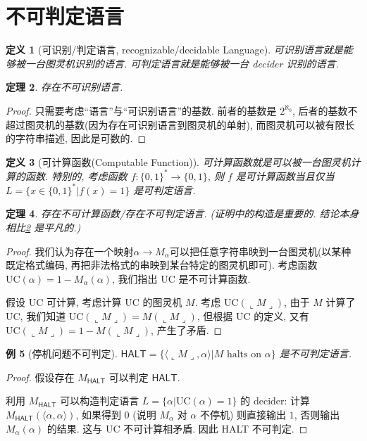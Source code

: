 \documentclass[8pt]{article}
\theoremstyle{compact}
\newtheorem{theorem}{定理}[section]
\newtheorem{definition}[theorem]{定义}
\newtheorem{example}[theorem]{例}
\def\rep#1{\llcorner{#1}\lrcorner}
\begin{document}
\section{不可判定语言}
\begin{definition}[可识别/判定语言, recognizable/decidable Language]
	可识别语言就是能够被一台图灵机识别的语言. 可判定语言就是能够被一台 decider 识别的语言.
\end{definition}
\begin{theorem}
	存在不可识别语言.
	\label{unrecognize_exists}
\end{theorem}
\begin{proof}
	只需要考虑“语言”与“可识别语言”的基数. 前者的基数是 $2^{\aleph_0}$, 后者的基数不超过图灵机的基数(因为存在可识别语言到图灵机的单射), 而图灵机可以被有限长的字符串描述, 因此是可数的.
\end{proof}
\begin{definition}[可计算函数(Computable Function)]
	可计算函数就是可以被一台图灵机计算的函数. 特别的, 考虑函数 $f: \{0, 1\}^* \to \{0, 1\}$, 则 $f$ 是可计算函数当且仅当 $L = \{x \in \{0, 1\}^*| f(x) = 1\}$ 是可判定语言.
\end{definition}
\begin{theorem}
	存在不可计算函数/存在不可判定语言. (证明中的构造是重要的. 结论本身相比\cref{unrecognize_exists} 是平凡的.)
\end{theorem}
\begin{proof}
	我们认为存在一个映射$\alpha \to M_{\alpha}$可以把任意字符串映到一台图灵机(以某种既定格式编码, 再把非法格式的串映到某台特定的图灵机即可). 考虑函数 $\text{UC}(\alpha) = 1 - M_{\alpha}(\alpha)$, 我们指出 $\text{UC}$ 是不可计算函数.

	假设 $\text{UC}$ 可计算, 考虑计算 $\text{UC}$ 的图灵机 $M$. 考虑 $\text{UC}(\rep{M})$, 由于 $M$ 计算了 $\text{UC}$, 我们知道 $\text{UC}(\rep{M}) = M(\rep M)$, 但根据 $\text{UC}$ 的定义, 又有 $\text{UC}(\rep M) = 1 - M(\rep M)$, 产生了矛盾.
\end{proof}
\begin{example}[停机问题不可判定]
	$\textsf{HALT} = \{\langle \rep M, \alpha \rangle | M \text{ halts on } \alpha\}$ 是不可判定语言.
\end{example}
\begin{proof}
	假设存在 $M_{\textsf{HALT}}$ 可以判定 $\textsf{HALT}$.
	
	利用 $M_{\textsf{HALT}}$ 可以构造判定语言 $L = \{\alpha | \text{UC}(\alpha) = 1\}$ 的 decider: 计算 $M_{\textsf{HALT}}(\langle \alpha, \alpha \rangle)$, 如果得到 $0$ (说明 $M_{\alpha}$ 对 $\alpha$ 不停机) 则直接输出 $1$, 否则输出$M_{\alpha}(\alpha)$ 的结果. 这与 $\text{UC}$ 不可计算相矛盾. 因此 \textsf{HALT} 不可判定.
\end{proof}
\end{document}
